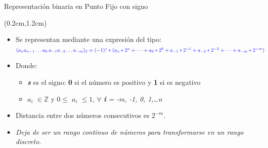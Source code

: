 \begin{frame}{Representación binaria en Punto Fijo con signo}
 \begin{textblock*}{\textwidth}(0.2cm,1.2cm)
  \begin{itemize}[<+(1)->]  \justifying \parskip 0.3cm
   \item Se representan mediante una expresión del tipo:\\
   $\color{blue}(a_{n}a_{n-1}\dots a_0.a_{-1}a_{-2}\dots a_{-m})_{2} = (-1)^{s}*(a_{n}*2^{n}+\dots + a_{0}*2^{0} + a_{-1}*2^{-1} + a_{-2}*2^{-2} +\dots+ a_{-m}*2^{-m})$
   \item Donde:
   \begin{itemize} \justifying
    \item \textbf{\textit{\color{blue}s}} \color{black}es el signo: \textbf{0} si el número es positivo y \textbf{1} si es negativo
    \item \textbf{\textit{\color{blue}$a_i$}} $\in  \mathbb{Z} $ y  $0 \leq$ \textbf{\textit{\color{blue}$a_i$}} $\leq 1$, $\forall$ \textbf{\textit{\color{blue}i}}\color{black} \textit{= -m, -1, 0, 1,\dots n}
   \end{itemize}
   \item Distancia entre dos números consecutivos es $2^{-m}$.
   \item \color{red}\textit{Deja de ser un rango continuo de números para transformarse en un rango discreto.}
  \end{itemize}
 \end{textblock*}
\end{frame}

